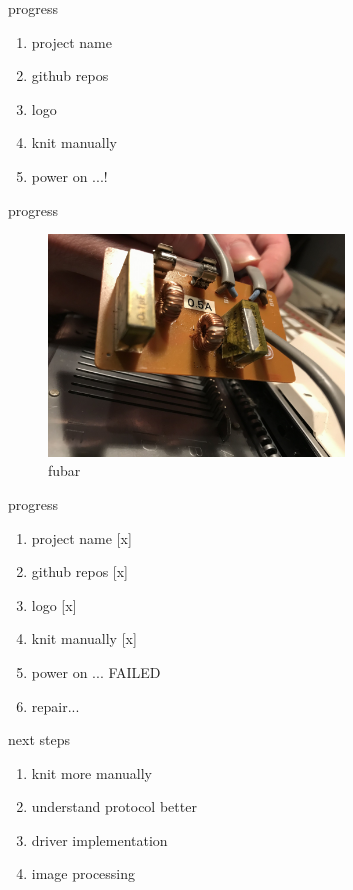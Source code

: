 \documentclass{beamer}
\begin{document}
\begin{frame}{progress}
    \begin{enumerate}
        \item project name \pause [x]
        \item github repos \pause [x]
        \item logo \pause [x]
        \item knit manually \pause [x]
        \item power on ...!
    \end{enumerate}
\end{frame}

\begin{frame}{progress}
    \begin{figure}
        \includegraphics[width=0.7\textwidth]{./images/exploded-capacitor.png}
        \caption{fubar}
    \end{figure}
\end{frame}

\begin{frame}{progress}
    \begin{enumerate}
        \item project name [x]
        \item github repos [x]
        \item logo [x]
        \item knit manually [x]
        \item power on ... FAILED\pause
        \item repair...
    \end{enumerate}
\end{frame}


\begin{frame}{next steps}
    \begin{enumerate}
        \item knit more manually
        \item understand protocol better
        \item driver implementation
        \item image processing
    \end{enumerate}
\end{frame}
\end{document}
